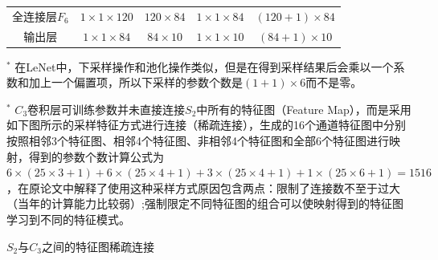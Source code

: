 \documentclass[12pt,a4paper,UTF8,twoside]{book}
\begin{document}
\begin{longtable}[]{@{}ccccc@{}}
\begin{minipage}[t]{0.12\columnwidth}\centering
全连接层\(F_6\)\strut
\end{minipage} & \begin{minipage}[t]{0.16\columnwidth}\centering
\(1\times1\times120\)\strut
\end{minipage} & \begin{minipage}[t]{0.19\columnwidth}\centering
\(120\times84\)\strut
\end{minipage} & \begin{minipage}[t]{0.16\columnwidth}\centering
\(1\times1\times84\)\strut
\end{minipage} & \begin{minipage}[t]{0.24\columnwidth}\centering
\((120+1)\times84\)\strut
\end{minipage}\tabularnewline
\begin{minipage}[t]{0.12\columnwidth}\centering
输出层\strut
\end{minipage} & \begin{minipage}[t]{0.16\columnwidth}\centering
\(1\times1\times84\)\strut
\end{minipage} & \begin{minipage}[t]{0.19\columnwidth}\centering
\(84\times10\)\strut
\end{minipage} & \begin{minipage}[t]{0.16\columnwidth}\centering
\(1\times1\times10\)\strut
\end{minipage} & \begin{minipage}[t]{0.24\columnwidth}\centering
\((84+1)\times10\)\strut
\end{minipage}\tabularnewline
\bottomrule
\end{longtable}

\(^*\) 在LeNet中，下采样操作和池化操作类似，但是在得到采样结果后会乘以一个系数和加上一个偏置项，所以下采样的参数个数是\((1+1)\times6\)而不是零。

\(^*\) \(C_3\)卷积层可训练参数并未直接连接\(S_2\)中所有的特征图（Feature Map），而是采用如下图所示的采样特征方式进行连接（稀疏连接），生成的16个通道特征图中分别按照相邻3个特征图、相邻4个特征图、非相邻4个特征图和全部6个特征图进行映射，得到的参数个数计算公式为\(6\times(25\times3+1)+6\times(25\times4+1)+3\times(25\times4+1)+1\times(25\times6+1)=1516\)，在原论文中解释了使用这种采样方式原因包含两点：限制了连接数不至于过大（当年的计算能力比较弱）;强制限定不同特征图的组合可以使映射得到的特征图学习到不同的特征模式。

\(S_2\)与\(C_3\)之间的特征图稀疏连接
\end{document}
